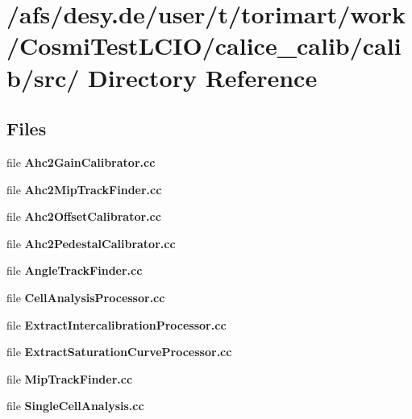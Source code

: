 \section{/afs/desy.de/user/t/torimart/work/CosmiTestLCIO/calice\_\-calib/calib/src/ Directory Reference}
\label{dir_7ade78cf69156e1229352c5e42492e10}
\subsection*{Files}
\begin{DoxyCompactItemize}
\item 
file {\bfseries Ahc2GainCalibrator.cc}
\item 
file {\bfseries Ahc2MipTrackFinder.cc}
\item 
file {\bfseries Ahc2OffsetCalibrator.cc}
\item 
file {\bfseries Ahc2PedestalCalibrator.cc}
\item 
file {\bfseries AngleTrackFinder.cc}
\item 
file {\bfseries CellAnalysisProcessor.cc}
\item 
file {\bfseries ExtractIntercalibrationProcessor.cc}
\item 
file {\bfseries ExtractSaturationCurveProcessor.cc}
\item 
file {\bfseries MipTrackFinder.cc}
\item 
file {\bfseries SingleCellAnalysis.cc}
\end{DoxyCompactItemize}
